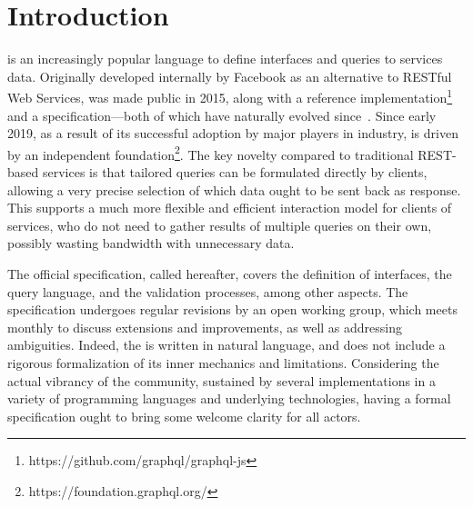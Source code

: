 \section{Introduction}

\gql is an increasingly popular language to define interfaces and queries to services data. Originally developed internally by Facebook as an alternative to RESTful Web Services, \gql was made public in 2015, along with a reference implementation\footnote{https://github.com/graphql/graphql-js} and a specification---both of which have naturally evolved since~\cite{gqlspec}. Since early 2019, as a result of its successful adoption by major players in industry,
\gql is driven by an independent foundation\footnote{https://foundation.graphql.org/}. The key novelty compared to traditional REST-based services is that tailored queries can be formulated directly by clients, allowing a very precise selection of which data ought to be sent back as response. This supports a much more flexible and efficient interaction model for clients of services, who do not need to gather results of multiple queries on their own, possibly wasting bandwidth with unnecessary data.


The official \gql specification, called \spec hereafter, 
covers the definition of interfaces, the query language, and the validation processes, among other aspects. The specification undergoes regular revisions by an open working group, which meets monthly to discuss extensions and improvements, as well as addressing ambiguities. Indeed, the \spec is written in natural language, and does not include a rigorous formalization of  its inner mechanics and limitations.
Considering the actual vibrancy of the \gql community, sustained by several implementations in a variety of programming languages and underlying technologies, having a formal specification ought to bring some welcome clarity for all actors.

